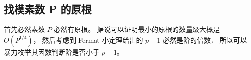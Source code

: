 \subsection{找模素数 P 的原根}

首先必然素数 $P$ 必然有原根。
据说可以证明最小的原根的数量级大概是 $O(P^{1/4})$，
然后考虑到 Fermat 小定理给出的 $p-1$ 必然是阶的倍数，
所以可以暴力枚举其因数判断阶是否小于 $p-1$。

